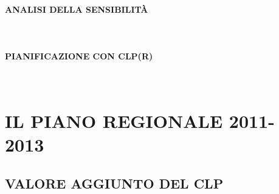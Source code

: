 \documentclass[12pt,a4paper,openright,twoside]{report}
\newcommand{\myparagraph}[1]{\paragraph{#1}\mbox{}\\}
\begin{document}
\myparagraph{ANALISI DELLA SENSIBILITÀ}

\myparagraph{PIANIFICAZIONE CON CLP(R)}

\section{IL PIANO REGIONALE 2011-2013}

\subsection{VALORE AGGIUNTO DEL CLP}



\nocite{*}


\end{document}
